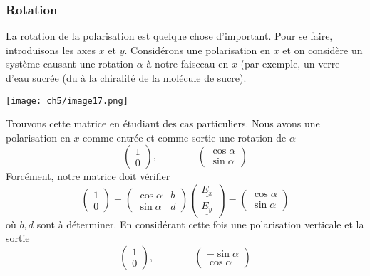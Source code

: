 		\subsubsection{Rotation}
		La rotation de la polarisation est quelque chose d'important. Pour se faire, introduisons 
		les axes $x$ et $y$. Considérons une polarisation en $x$ et on considère un système causant 
		une rotation $\alpha$ à notre faisceau en $x$ (par exemple, un verre d'eau sucrée (du à la 
		chiralité de la molécule de sucre).
	\begin{center}
	\texttt{[image: ch5/image17.png]}
\end{center}			
	 Trouvons cette matrice en étudiant des cas particuliers. 
		Nous avons une polarisation en $x$ comme entrée et comme sortie une rotation de $\alpha$
		\begin{equation}
		\left(\begin{array}{c}
		1\\
		0
		\end{array}\right),\qquad\qquad		\left(\begin{array}{c}
		\cos\alpha\\
		\sin\alpha
		\end{array}\right)
		\end{equation}
		Forcément, notre matrice doit vérifier
		\begin{equation}
			\left(\begin{array}{c}
		1\\
		0
		\end{array}\right) = \left(\begin{array}{cc}
		\cos\alpha & b\\
		\sin\alpha & d
		\end{array}\right)\left(\begin{array}{c}
		\underline{E_x}\\
		\underline{E_y}
		\end{array}\right)= \left(\begin{array}{c}
		\cos\alpha\\
		\sin\alpha
		\end{array}\right)
		\end{equation}
		où $b,d$ sont à déterminer. En considérant cette fois une polarisation verticale et la sortie
		\begin{equation}
				\left(\begin{array}{c}
		1\\
		0
		\end{array}\right),\qquad\qquad		\left(\begin{array}{c}
		-\sin\alpha\\
		\cos\alpha
		\end{array}\right)
	\end{equation}				
